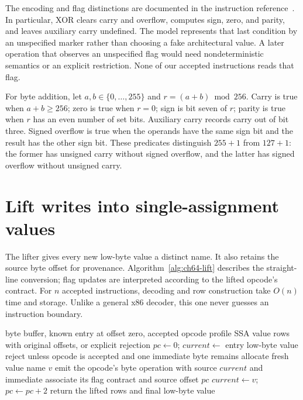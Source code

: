 The encoding and flag distinctions are documented in the instruction reference~\cite{cloutier-2026-x86}.
In particular, XOR clears carry and overflow, computes sign, zero, and parity, and leaves auxiliary carry undefined.
The model represents that last condition by an unspecified marker rather than choosing a fake architectural value.
A later operation that observes an unspecified flag would need nondeterministic semantics or an explicit restriction.
None of our accepted instructions reads that flag.

For byte addition, let $a,b\in\{0,\ldots,255\}$ and $r=(a+b)\bmod256$.
Carry is true when $a+b\ge256$; zero is true when $r=0$; sign is bit seven of $r$; parity is true when $r$ has an even number of set bits.
Auxiliary carry records carry out of bit three.
Signed overflow is true when the operands have the same sign bit and the result has the other sign bit.
These predicates distinguish $255+1$ from $127+1$: the former has unsigned carry without signed overflow, and the latter has signed overflow without unsigned carry.

\section{Lift writes into single-assignment values}
\label{sec:ch64-lift}

The lifter gives every new low-byte value a distinct name.
It also retains the source byte offset for provenance.
Algorithm~\ref{alg:ch64-lift} describes the straight-line conversion; flag updates are interpreted according to the lifted opcode's contract.
For $n$ accepted instructions, decoding and row construction take $O(n)$ time and storage.
Unlike a general x86 decoder, this one never guesses an instruction boundary.

\begin{algorithm}[htbp]
\caption{Lift the fixed two-byte AL instruction subset.}
\label{alg:ch64-lift}
\begin{pseudocode}
\Require byte buffer, known entry at offset zero, accepted opcode profile
\Ensure SSA value rows with original offsets, or explicit rejection
\State $pc\gets0$; $current\gets$ entry low-byte value
  \State reject unless opcode is accepted and one immediate byte remains
  \State allocate fresh value name $v$
  \State emit the opcode's byte operation with source $current$ and immediate
  \State associate its flag contract and source offset $pc$
  \State $current\gets v$; $pc\gets pc+2$
\EndWhile
\State return the lifted rows and final low-byte value
\end{pseudocode}
\end{algorithm}

